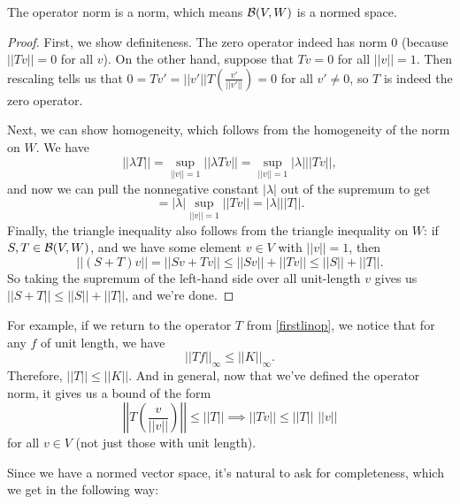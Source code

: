 \begin{theorem}
The operator norm is a norm, which means $\mathcal{B}(V, W)$ is a normed space. 
\end{theorem}
\begin{proof}
First, we show definiteness. The zero operator indeed has norm $0$ (because $||Tv|| = 0$ for all $v$). On the other hand, suppose that $Tv = 0$ for all $||v|| = 1$. Then rescaling tells us that $0 = Tv' = ||v'|| T\left(\frac{v'}{||v'||}\right) = 0$ for all $v' \ne 0$, so $T$ is indeed the zero operator.

Next, we can show homogeneity, which follows from the homogeneity of the norm on $W$. We have 
\[
    \boxed{||\lambda T||} = \sup_{||v|| = 1} ||\lambda Tv|| = \sup_{||v|| = 1} |\lambda| ||Tv||,
\]
and now we can pull the nonnegative constant $|\lambda|$ out of the supremum to get 
\[
    = |\lambda| \sup_{||v|| = 1} ||Tv|| = \boxed{|\lambda| ||T||}.
\]
Finally, the triangle inequality also follows from the triangle inequality on $W$: if $S, T \in \mathcal{B}(V, W)$, and we have some element $v \in V$ with $||v|| = 1$, then 
\[
    ||(S+T)v|| = ||Sv + Tv|| \le ||Sv|| + ||Tv|| \le ||S|| + ||T||.
\]
So taking the supremum of the left-hand side over all unit-length $v$ gives us $||S+T|| \le ||S|| + ||T||$, and we're done.
\end{proof}

For example, if we return to the operator $T$ from \cref{firstlinop}, we notice that for any $f$ of unit length, we have
\[
    ||Tf||_{\infty} \le ||K||_{\infty}.
\]
Therefore, $||T|| \le ||K||$. And in general, now that we've defined the operator norm, it gives us a bound of the form 
\[
    \left|\left|T\left(\frac{v}{||v||}\right)\right|\right| \le ||T|| \implies ||Tv|| \le ||T|| \, \, ||v||
\]
for all $v \in V$ (not just those with unit length).

Since we have a normed vector space, it's natural to ask for completeness, which we get in the following way:

